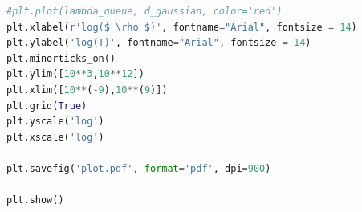 \documentclass[onecolumn]{aastex6}
\newcommand\aastex{AAS\TeX}
\begin{document}
\begin{lstlisting}[language=Python, caption=Python source code.]
#plt.plot(lambda_queue, d_gaussian, color='red')
plt.xlabel(r'log($ \rho $)', fontname="Arial", fontsize = 14)
plt.ylabel('log(T)', fontname="Arial", fontsize = 14)
plt.minorticks_on()
plt.ylim([10**3,10**12])
plt.xlim([10**(-9),10**(9)])
plt.grid(True)
plt.yscale('log')
plt.xscale('log')

plt.savefig('plot.pdf', format='pdf', dpi=900)

plt.show()
\end{lstlisting}








\end{document}
